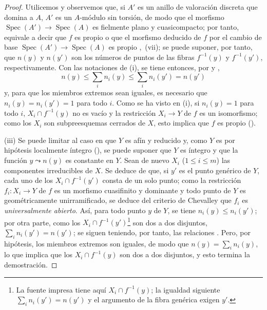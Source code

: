 \begin{proof}
Utilicemos  y observemos que, si $A'$ es un anillo de valoración discreta que domina a $A$, $A'$ es un $A$-módulo sin torsión, de modo que el morfismo $\operatorname{Spec}(A')\to\operatorname{Spec}(A)$ es fielmente plano y cuasicompacto; por tanto, equivale a decir que $f$ es propio o que el morfismo deducido de $f$ por el cambio de base $\operatorname{Spec}(A')\to\operatorname{Spec}(A)$ es
propio ,~(vii); se puede suponer, por tanto, que $n(y)$ y $n(y')$ son los números de puntos de las fibras $f^{-1}(y)$ y $f^{-1}(y')$, respectivamente.
Con las notaciones de (i), se tiene entonces, por  y ,
\begin{equation}
\tag{15.5.2.4}
\label{IV.15.5.2.4-fr}
  n(y)\leqslant\sum_i n_i(y)\leqslant\sum_i n_i(y')=n(y')
\end{equation}
y, para que los miembros extremos sean iguales, es necesario que $n_i(y)=n_i(y')=1$ para todo $i$.
Como se ha visto en (i), si $n_i(y)=1$ para todo $i$, $X_i\cap f^{-1}(y)$ no es vacío y la restricción $X_i\to Y$ de $f$ es un isomorfismo; como los $X_i$ son subpreesquemas cerrados de $X$, esto implica que $f$ es propio ().

(iii)
Se puede limitar al caso en que $Y$ es afín y reducido y, como $Y$ es por hipótesis localmente íntegro (), se puede suponer que $Y$ es íntegro y que la función $y\leadsto n(y)$ es constante en $Y$.
Sean de nuevo $X_i$ ($1\leqslant i\leqslant m$) las componentes irreducibles de $X$.
Se deduce de  que, si $y'$ es el punto genérico de $Y$, cada uno de los $X_i\cap f^{-1}(y')$ consta de un solo punto; como la restricción $f_i:X_i\to Y$ de $f$ es un morfismo cuasifinito y dominante y todo punto de $Y$ es geométricamente unirramificado, se deduce del criterio de Chevalley  que $f_i$ es \emph{universalmente abierto}.
Así, para todo punto $y$ de $Y$, se tiene $n_i(y)\leqslant n_i(y')$; por otra parte, como los $X_i\cap f^{-1}(y')$\footnote{La fuente impresa tiene aquí $X_i\cap f^{-1}(y)$; la igualdad siguiente $\sum_i n_i(y')=n(y')$ y el argumento de la fibra genérica exigen $y'$.} son dos a dos disjuntos, $\sum_i n_i(y')=n(y')$; se siguen teniendo, por tanto, las relaciones .
Pero, por hipótesis, los miembros extremos son iguales, de modo que $n(y)=\sum_i n_i(y)$, lo que implica que los $X_i\cap f^{-1}(y)$ son dos a dos disjuntos, y esto termina la demostración.
\end{proof}

